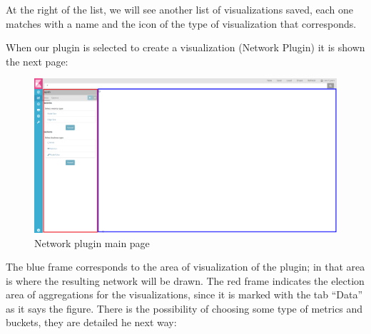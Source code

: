\documentclass[a4paper, 12pt]{book}
\begin{document}
At the right of the list, we will see another list of visualizations saved, each one matches with a name and the icon of the type of visualization that corresponds.

When our plugin is selected to create a visualization (Network Plugin) it is shown the next page: 

\begin{figure}[H]
  \centering
  \includegraphics[width=16cm, keepaspectratio]{img/results/pagevis}
  \caption{Network plugin main page}
  \label{fig:pagevisnetwork}
\end{figure}

The blue frame corresponds to the area of visualization of the plugin; in  that area is where the resulting network will be drawn. The red frame indicates the election area of aggregations for the visualizations, since it is marked with the tab “Data” as it says the figure. There is the possibility of choosing some type of metrics and buckets, they are detailed he next way: 
\end{document}
